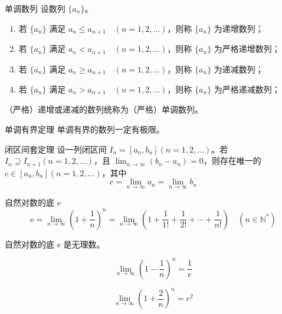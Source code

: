 \begin{definition}{单调数列}
    设数列 $\{a_n\}$。
    \begin{enumerate}
        \item 若 $\{a_n\}$ 满足 $a_n \leqslant a_{n + 1}\quad (n=1,2, \ldots)$，则称 $\{a_n\}$ 为递增数列；
        \item 若 $\{a_n\}$ 满足 $a_n < a_{n + 1}\quad (n=1,2, \ldots)$，则称 $\{a_n\}$ 为严格递增数列；
        \item 若 $\{a_n\}$ 满足 $a_n \geqslant a_{n + 1}\quad (n=1,2, \ldots)$，则称 $\{a_n\}$ 为递减数列；
        \item 若 $\{a_n\}$ 满足 $a_n > a_{n + 1}\quad (n=1,2, \ldots)$，则称 $\{a_n\}$ 为严格递减数列；
    \end{enumerate}
    （严格）递增或递减的数列统称为（严格）单调数列。
\end{definition}

\begin{theorem}{单调有界定理}
    单调有界的数列一定有极限。
\end{theorem}

\begin{theorem}{闭区间套定理}
    设一列闭区间 $I_n = [a_n, b_n](n = 1,2, \ldots)$。若 $I_n \supseteq I_{n + 1}(n = 1,2, \ldots)$，且 $\displaystyle \lim_{n \to \infty}(b_n - a_n) = 0$，则存在唯一的 $c \in [a_n, b_n](n = 1,2, \ldots)$，其中
    \[c = \lim_{n \to \infty}a_n = \lim_{n \to \infty}b_n\]
\end{theorem}

\begin{theorem}{自然对数的底 e}
    \[\mathrm{e} = \lim_{n \to \infty}\left(1 + \frac{1}{n}\right)^{n} = \lim_{n \to \infty}\left(1 + \frac{1}{1!} + \frac{1}{2!} + \cdots + \frac{1}{n!}\right)\quad (n \in \mathbb{N}^{*})\]
\end{theorem}

\begin{theorem}
    自然对数的底 $\mathrm{e}$ 是无理数。
\end{theorem}

\hfill

\begin{example}
    \[\lim_{n \to \infty}\left(1 - \frac{1}{n}\right)^{n} = \frac{1}{e}\]
\end{example}

\hfill

\begin{example}
    \[\lim_{n \to \infty}\left(1 + \frac{2}{n}\right)^{n} = e^2\]
\end{example}

